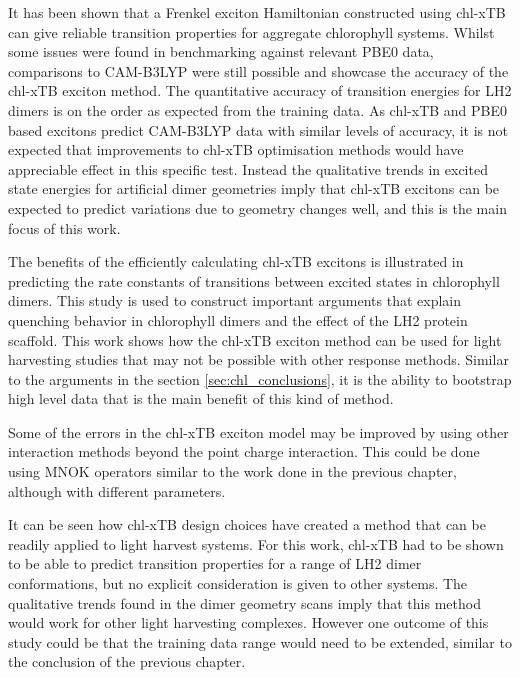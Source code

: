 It has been shown that a Frenkel exciton Hamiltonian constructed using chl-xTB can
give reliable transition properties for aggregate chlorophyll systems. Whilst some
issues were found in benchmarking against relevant PBE0 data, comparisons to CAM-B3LYP 
were still possible and showcase the accuracy of the chl-xTB exciton method. The
quantitative accuracy of transition energies for LH2 dimers is on the order as expected
from the training data. As chl-xTB and PBE0 based excitons predict CAM-B3LYP data
with similar levels of accuracy, it is not expected that improvements to chl-xTB
optimisation methods would have appreciable effect in this specific test. Instead
the qualitative trends in excited state energies for artificial dimer geometries
imply that chl-xTB excitons can be expected to predict variations due to geometry 
changes well, and this is the main focus of this work.

The benefits of the efficiently calculating chl-xTB excitons is illustrated in 
predicting the rate constants of transitions between excited states in chlorophyll
dimers. This study is used to construct important arguments that explain quenching
behavior in chlorophyll dimers and the effect of the LH2 protein scaffold. This work
shows how the chl-xTB exciton method can be used for light harvesting studies that 
may not be possible with other response methods. Similar to the arguments in the 
section \ref{sec:chl_conclusions}, it is the ability to bootstrap high level data 
that is the main benefit of this kind of method.

Some of the errors in the chl-xTB exciton model may be improved by using other interaction
methods beyond the point charge interaction. This could be done using MNOK operators
similar to the work done in the previous chapter, although with different parameters.

It can be seen how chl-xTB design choices have created a method that can be readily 
applied to light harvest systems. For this work, chl-xTB had to be shown to be able
to predict transition properties for a range of LH2 dimer conformations, but no 
explicit consideration is given to other systems. The qualitative trends found in
the dimer geometry scans imply that this method would work for other light harvesting
complexes. However one outcome of this study could be that the training data range
would need to be extended, similar to the conclusion of the previous chapter. 
